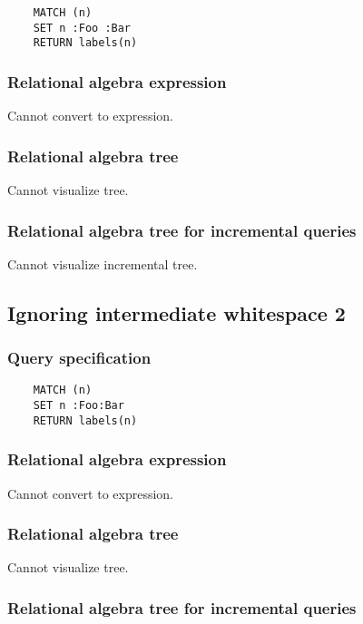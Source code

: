 	\begin{lstlisting}
	MATCH (n)
	SET n :Foo :Bar
	RETURN labels(n)
	\end{lstlisting}


	\subsubsection*{Relational algebra expression}

	Cannot convert to expression.

	\subsubsection*{Relational algebra tree}

	Cannot visualize tree.

	\subsubsection*{Relational algebra tree for incremental queries}

	Cannot visualize incremental tree.
	\subsection{Ignoring intermediate whitespace 2}

	\subsubsection*{Query specification}

	\begin{lstlisting}
	MATCH (n)
	SET n :Foo:Bar
	RETURN labels(n)
	\end{lstlisting}


	\subsubsection*{Relational algebra expression}

	Cannot convert to expression.

	\subsubsection*{Relational algebra tree}

	Cannot visualize tree.

	\subsubsection*{Relational algebra tree for incremental queries}

